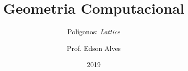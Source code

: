 \title{Geometria Computacional}
\subtitle{Polígonos: \textit{Lattice}}
\date{2019}
\author{Prof. Edson Alves}
